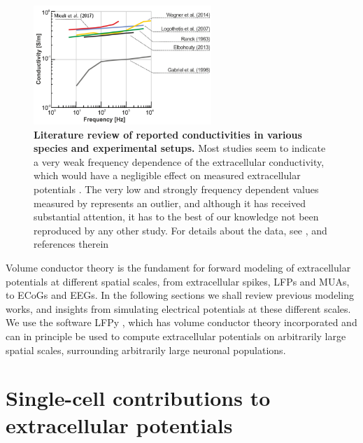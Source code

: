 \documentclass[preprint,11pt,authoryear]{elsarticle}
\newcommand{\hlb}[2][blue]{ {\sethlcolor{#1} \hl{#2}} }
\newcommand{\ghnote}[1]{\color{white}{\hlb{GH: #1 }}\color{black}}
\begin{document}
\begin{figure}[!ht]
\begin{center}
\includegraphics[width=0.6\textwidth]{frequency_dependence}
\end{center}
\caption{\textbf{Literature review of reported conductivities in various species and experimental setups.} 
Most studies seem to indicate a very weak frequency dependence of the extracellular conductivity, which would have a negligible effect on measured extracellular potentials \citep{Miceli2017}. The very low and strongly frequency dependent values measured by \cite{Gabriel1996} represents an outlier, and although it has received substantial attention, it has to the best of our knowledge not been reproduced by any other study.
For details about the data, see \citep{Miceli2017}, and references therein \citep{Ranck1963, Gabriel1996, Logothetis2007, Elbohouty2013, Wagner2014}
}
\label{fig:freq_dep}
\end{figure}


Volume conductor theory is the fundament for forward modeling of extracellular potentials at different spatial scales, from extracellular spikes, LFPs and MUAs, to ECoGs and EEGs. In the following sections we shall review previous modeling works, and insights from simulating electrical potentials at these different scales.
We use the software LFPy \citep{Linden2014, Hagen2018, Hagen2019}, which has volume conductor theory incorporated and can in principle be used to compute extracellular potentials on arbitrarily large spatial scales, surrounding arbitrarily large neuronal populations. 


\section{Single-cell contributions to extracellular potentials} \label{sec:ExtracellularPotentials}
\end{document}
